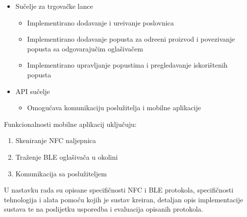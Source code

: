\begin{itemize}
	\item Su\v{c}elje za trgova\v{c}ke lance
	\begin{itemize}
		\item Implementirano dodavanje i ure\dj ivanje poslovnica
		\item Implementirano dodavanje popusta za odre\dj eni proizvod i povezivanje popusta sa odgovaraju\v{c}im ogla\v{s}iva\v{c}em
		\item Implementirano upravljanje popustima i pregledavanje iskori\v{s}tenih popusta
	\end{itemize}
	\item API su\v{c}elje
	
	\begin{itemize}
		\item Omogu\'{c}ava komunikaciju poslu\v{z}itelja i mobilne aplikacije
	\end{itemize}
\end{itemize}

Funkcionalnosti mobilne aplikacij uklju\v{c}uju:
\begin{enumerate}
	\item Skeniranje NFC naljepnica
	\item Tra\v{z}enje BLE ogla\v{s}iva\v{c}a u okolini
	\item Komunikacija sa poslu\v{z}iteljem
\end{enumerate}

U nastavku rada su opisane specifi\v{c}nosti NFC i BLE protokola, specifi\v{c}nosti tehnologija i alata pomo\'{c}u kojih je sustav kreiran, detaljan opis implementacije sustava te na poslijetku usporedba i evaluacija opisanih protokola.





